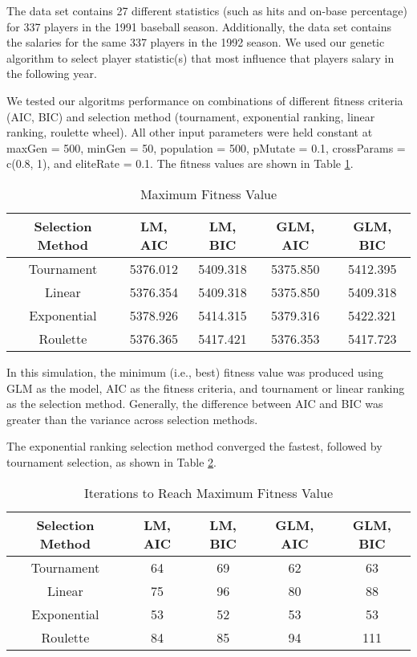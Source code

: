 \documentclass{article}
\begin{document}
The data set contains 27 different statistics (such as hits and on-base percentage) for 337 players in the 1991 baseball season.  Additionally, the data set contains the salaries for the same 337 players in the 1992 season.  We used our genetic algorithm to select player statistic(s) that most influence that players salary in the following year.

We tested our algoritms performance on combinations of different fitness criteria (AIC, BIC) and selection method (tournament, exponential ranking, linear ranking, roulette wheel).  All other input parameters were held constant at maxGen = 500, minGen = 50, population = 500, pMutate = 0.1, crossParams = c(0.8, 1), and  eliteRate = 0.1.  The fitness values are shown in Table \ref{table:7}.

\begin{table}[htp]
    \centering
    \caption{Maximum Fitness Value}

\begin{tabular}{ |c|c|c|c|c|  }

 \hline
 Selection Method & LM, AIC & LM, BIC & GLM, AIC & GLM, BIC\\
 \hline
 Tournament &  5376.012   & 5409.318 & 5375.850  & 5412.395\\
 Linear & 5376.354 & 5409.318  & 5375.850 & 5409.318\\
 Exponential & 5378.926 & 5414.315 & 5379.316 & 5422.321\\
 Roulette   & 5376.365 & 5417.421 & 5376.353 & 5417.723\\
 \hline
\end{tabular}
    \label{table:7}
\end{table}

\vspace{5cm}

In this simulation, the minimum (i.e., best) fitness value was produced using GLM as the model, AIC as the fitness criteria, and tournament or linear ranking as the selection method.  Generally, the difference between AIC and BIC was greater than the variance across selection methods.

The exponential ranking selection method converged the fastest, followed by tournament selection, as shown in Table \ref{table:8}.

\begin{table}[htp]
    \centering
    \caption{Iterations to Reach Maximum Fitness Value}

\begin{tabular}{ |c|c|c|c|c|  }
 \hline
 Selection Method & LM, AIC & LM, BIC & GLM, AIC & GLM, BIC\\
 \hline
 Tournament & 64  & 69 & 62  & 63\\
 Linear & 75 & 96  & 80 & 88\\
 Exponential & 53 & 52 & 53 & 53\\
 Roulette   & 84 & 85 & 94 & 111\\
 \hline
\end{tabular}

    \label{table:8}
\end{table}
\end{document}
